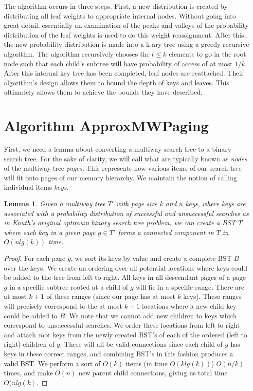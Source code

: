 \documentclass[letterpaper,12pt,titlepage,oneside,final]{book}
\theoremstyle{plain}
\newtheorem{lem}[thm]{Lemma}
\begin{document}
 The algorithm occurs in three steps. First, a new distribution is created by distributing all leaf weights to appropriate internal nodes. Without going into great detail, essentially an examination of the peaks and valleys of the probability distribution of the leaf weights is used to do this weight reassignment. After this, the new probability distribution is made into a k-ary tree using a greedy recursive algorithm. The algorithm recursively chooses the $l \leq k$ elements to go in the root node such that each child's subtree will have probability of access of at most $1/k$. After this internal key tree has been completed, leaf nodes are reattached. Their algorithm's design allows them to bound the depth of keys and leaves. This ultimately allows them to achieve the bounds they have described. 

\section{Algorithm ApproxMWPaging}\label{Algorithm ApproxMWPaging}

First, we need a lemma about converting a multiway search tree to a binary search tree. For the sake of clarity, we will call what are typically known as \textit{nodes} of the multiway tree \textit{pages}. This represents how various items of our search tree will fit onto pages of our memory hierarchy. We maintain the notion of calling individual items \textit{keys}.

\begin{lem}\label{MWTBSTLem}
Given a multiway tree $T'$ with page size $k$ and $n$ keys, where keys are associated with a probability distribution of successful and unsuccessful searches as in Knuth's original optimum binary search tree problem, we can create a BST $T$ where each key in a given page $g \in T'$ forms a connected component in $T$ in $O(nlg(k))$ time.
\end{lem}

\begin{proof}
For each page $g$, we sort its keys by value and create a complete BST $B$ over the keys. We create an ordering over all potential locations where keys could be added to the tree from left to right. All keys in all descendant pages of a page $g$ in a specific subtree rooted at a child of $g$ will lie in a specific range. There are at most $k+1$ of these ranges (since our page has at most $k$ keys). These ranges will precisely correspond to the at most $k+1$ locations where a new child key could be added to $B$. We note that we cannot add new children to keys which correspond to unsuccessful searches. We order these locations from left to right and attach root keys from the newly created BST's of each of the ordered (left to right) children of $g$. These will all be valid connections since each child of $g$ has keys in these correct ranges, and combining BST's in this fashion produces a valid BST. We perform a sort of $O(k)$ items (in time $O(klg(k))$) $O(n/k)$ times, and make $O(n)$ new parent child connections, giving us total time $O(n lg(k)$.
\end{proof}
\end{document}
